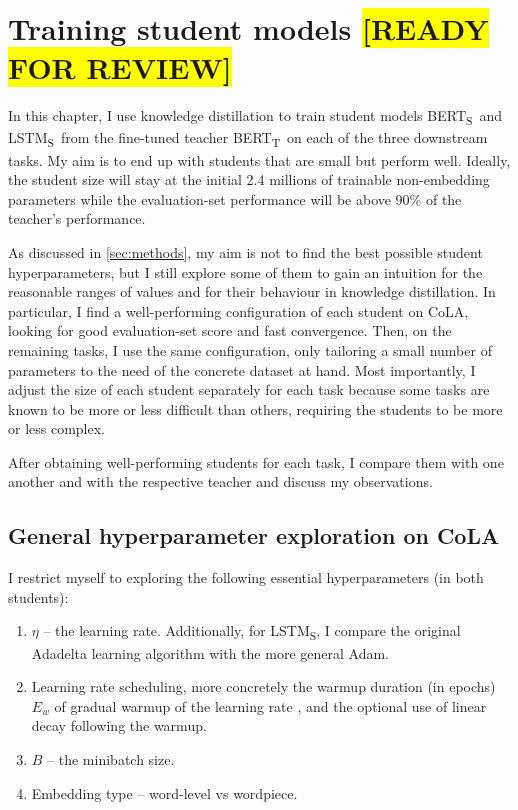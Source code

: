 \documentclass[bsc,frontabs,twoside,singlespacing,parskip,deptreport]{infthesis}
\def\reviewready{\colorbox{yellow}{[READY FOR REVIEW]}}
\def\BERTT{BERT\textsubscript{T}}
\def\BERTS{BERT\textsubscript{S}}
\def\LSTMS{LSTM\textsubscript{S}}
\begin{document}
\chapter{Training student models \reviewready}{
  In this chapter, I use knowledge distillation to train student models \BERTS~and \LSTMS~from the fine-tuned teacher \BERTT~on each of the three downstream tasks.
  My aim is to end up with students that are small but perform well. Ideally, the student size will stay at the initial 2.4 millions of trainable non-embedding parameters while the evaluation-set performance will be above 90\% of the teacher's performance.

  As discussed in \autoref{sec:methods}, my aim is not to find the best possible student hyperparameters, but I still explore some of them to gain an intuition for the reasonable ranges of values and for their behaviour in knowledge distillation.
  In particular, I find a well-performing configuration of each student on CoLA, looking for good evaluation-set score and fast convergence. Then, on the remaining tasks, I use the same configuration, only tailoring a small number of parameters to the need of the concrete dataset at hand. Most importantly, I adjust the size of each student separately for each task because some tasks are known to be more or less difficult than others, requiring the students to be more or less complex.

  After obtaining well-performing students for each task, I compare them with one another and with the respective teacher and discuss my observations.

  \section{General hyperparameter exploration on CoLA}{
    \label{sec:hparam-general}

    I restrict myself to exploring the following essential hyperparameters (in both students):
    \begin{enumerate}
      \item $\eta$ -- the learning rate. Additionally, for \LSTMS, I compare the original Adadelta learning algorithm with the more general Adam.
      \item Learning rate scheduling, more concretely the warmup duration (in epochs) $E_{w}$ of gradual warmup of the learning rate \citep{Goyal_2017}, and the optional use of linear decay following the warmup.
      \item $B$ -- the minibatch size.
      \item Embedding type -- word-level vs wordpiece.
    \end{enumerate}

}}
\end{document}
